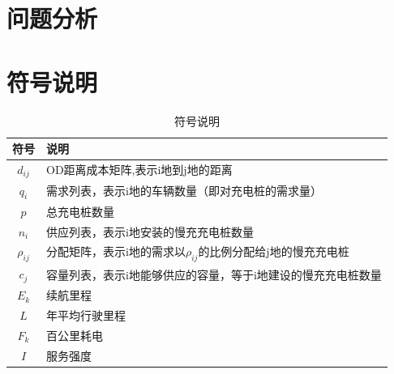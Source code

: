 \documentclass[12pt, a4paper, oneside]{ctexart}
\begin{document}
\section{问题分析}

\section{符号说明}
\begin{table}[H]
    \caption{符号说明}
    \centering
    \renewcommand{\arraystretch}{2}
    \begin{tabular*}{\textwidth}{c||l}%
        \toprule[1.5mm]
        \Large{\textbf{符号}} & \Large{\textbf{说明}} \\
        \midrule[1.5pt]
        \(d_{ij}\) & OD距离成本矩阵,表示i地到j地的距离 \\\hline
        \(q_i\)&需求列表，表示i地的车辆数量（即对充电桩的需求量）\\\hline
        \(p\)&总充电桩数量\\\hline
        \(n_i\)&供应列表，表示i地安装的慢充充电桩数量\\\hline
        \(\rho_{ij}\)&分配矩阵，表示i地的需求以\(\rho_{ij}\)的比例分配给j地的慢充充电桩\\\hline
        \(c_j\)&容量列表，表示i地能够供应的容量，等于i地建设的慢充充电桩数量\\\hline
        \(E_k\)&续航里程\\\hline
        \(L\)&年平均行驶里程\\\hline
        \(F_k\)&百公里耗电\\\hline
        \(I\)&服务强度\\\hline
        \bottomrule[1mm]
    \end{tabular*}
\end{table}
\end{document}
